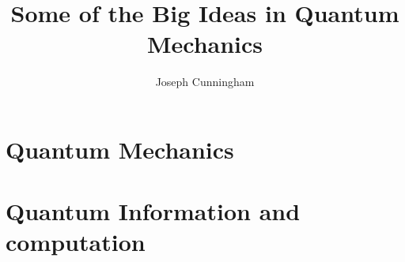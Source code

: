 \documentclass{report}
\title{Some of the Big Ideas in Quantum Mechanics}
\author{Joseph Cunningham}
\date{}
\begin{document}
\maketitle
\tableofcontents

\part{Quantum Mechanics}
\setcounter{chapter}{0} %


\part{Quantum Information and computation}
\setcounter{chapter}{0} %

\end{document}
